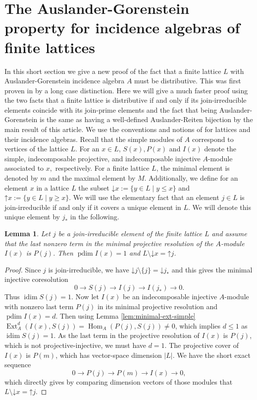\documentclass[a4paper]{amsart}
\newtheorem{lemma}[theorem]{Lemma}
\theoremstyle{definition}
\theoremstyle{remark}
\numberwithin{equation}{section}
\newcommand{\Ext}{\operatorname{Ext}}
\newcommand{\pdim}{\operatorname{pdim}}
\newcommand{\idim}{\operatorname{idim}}
\newcommand{\Hom}{\operatorname{Hom}}
\newcommand{\upset}[1]{\mathord{\uparrow}\!#1}
\newcommand{\downset}[1]{\mathord{\downarrow}\!#1}
\begin{document}
\section{The Auslander-Gorenstein property for incidence algebras of finite lattices}
In this short section we give a new proof of the fact that a finite lattice $L$ with Auslander-Gorenstein incidence algebra $A$ must be distributive. 
This was first proven in \cite[Theorem 5.4]{IM} by a long case distinction. Here we will give a much faster proof using the two facts that a finite lattice is distributive if and only if its join-irreducible elements coincide with its join-prime elements and the fact that being Auslander-Gorenstein is the same as having a well-defined Auslander-Reiten bijection by the main result of this article.
We use the conventions and notions of \cite{IM} for lattices and their incidence algebras. 
Recall that the simple modules of $A$ correspond to vertices of the lattice $L.$ 
For an $x\in L$, $S(x), P(x)$ and $I(x)$ denote the simple, indecomposable projective, and indecomposable injective $A$-module associated to $x,$ respectively. 
For a finite lattice $L$, the minimal element is denoted by $m$ and the maximal element by $M$. Additionally, we define for an element $x$ in a lattice $L$ the subset $\downset{x}  := \{y \in L \mid y \leq x \}$ and $\upset{x}  := \{y \in L \mid y \geq x \}.$
We will use the elementary fact that an element $j \in L$ is join-irreducible if and only if it covers a unique element in $L$. We will denote this unique element by $j_{*}$ in the following.
\begin{lemma} \label{mainlemmaARbijimpliesdist}
Let $j$ be a join-irreducible element of the finite lattice $L$ and assume that the last nonzero term in the minimal projective resolution of the $A$-module $I(x)$ is $P(j)$. Then $\pdim I(x)=1$ and $L \setminus \downset{x}=\upset{j}$.
\end{lemma}
\begin{proof}
Since $j$ is join-irreducible, we have $\downset j \setminus \{j \}= \downset j_*$ and this gives the minimal injective coresolution 
$$0 \rightarrow S(j) \rightarrow I(j) \rightarrow I(j_*) \rightarrow 0.$$
Thus $\idim S(j)=1$.
Now let $I(x)$ be an indecomposable injective $A$-module with nonzero last term $P(j)$ in its minimal projective resolution and $\pdim I(x)=d$.
Then using Lemma \ref{lem:minimal-ext-simple} $\Ext_A^d(I(x),S(j))=\Hom_A(P(j),S(j)) \neq 0$, which implies $d \leq 1$ as $\idim S(j)=1$.
As the last term in the projective resolution of $I(x)$ is $P(j)$, which is not projective-injective, we must have $d=1$.
The projective cover of $I(x)$ is $P(m)$, which has vector-space dimension $|L|$.
We have the short exact sequence 
$$0 \rightarrow P(j) \rightarrow P(m) \rightarrow I(x) \rightarrow 0,$$
which directly gives by comparing dimension vectors of those modules that $L \setminus \downset{x}=\upset{j}$.
\end{proof}
\end{document}
